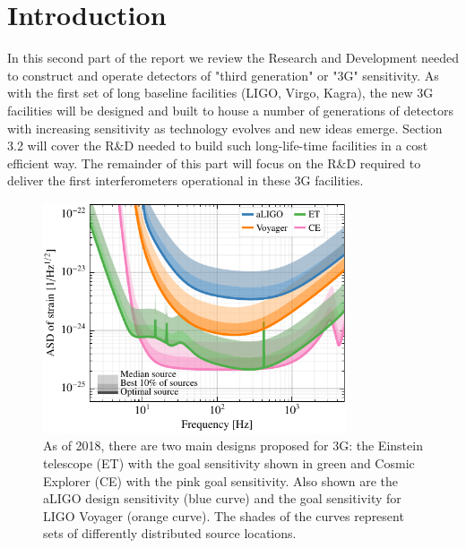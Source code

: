 \chapter{Introduction}
\label{sec:Intro}

In this second part of the report we review the Research and Development needed to construct and operate detectors of "third generation" or "3G" sensitivity. As with the first set of long baseline facilities (LIGO, Virgo, Kagra)\cite{AdvancedVirgo2015,AdvancedLIGO2015,KAGRA2013}, the new 3G facilities will be designed and built to house a number of generations of detectors with increasing sensitivity as technology evolves and new ideas emerge.  Section 3.2 will cover the R\&D needed to build such long-life-time facilities in a cost efficient way.  The remainder of this part will focus on the R\&D required to deliver the first interferometers operational in these 3G facilities.

\begin{figure}[ht]
\centering
\includegraphics*[width= 0.8\textwidth]{Figures/noises_percentiles.pdf}
\caption{As of 2018, there are two main designs proposed for 3G:  the Einstein telescope (ET) \cite{ET2011} with the goal sensitivity shown in green and Cosmic Explorer (CE) \cite{CosmicExplorer2017} with the pink goal sensitivity.  Also shown are the aLIGO design sensitivity (blue curve) and the goal sensitivity for LIGO Voyager (orange curve). The shades of the curves represent sets of differently distributed source locations.}
\label{fig:3GSens}
\end{figure}

